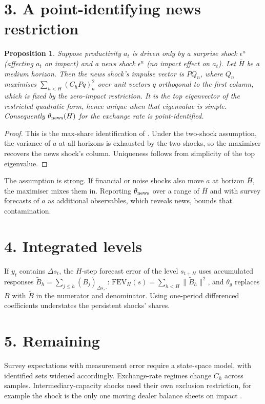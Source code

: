 \documentclass[11pt]{article}
\newtheorem{proposition}[theorem]{Proposition}
\theoremstyle{definition}
\begin{document}
\section*{3. A point-identifying news restriction}
\begin{proposition}\label{prop:maxshare}
Suppose productivity $a_t$ is driven only by a surprise shock $\epsilon^a$ (affecting $a_t$ on impact) and a news shock
$\epsilon^n$ (no impact effect on $a_t$). Let $\bar H$ be a medium horizon. Then the news shock's impulse vector is
$PQ_n$, where $Q_n$ maximises $\sum_{h<\bar H}(C_hPq)_a^2$ over unit vectors $q$ orthogonal to the first column, which
is fixed by the zero-impact restriction. It is the top eigenvector of the restricted quadratic form, hence unique when that
eigenvalue is simple. Consequently $\theta_{\rm news}(H)$ for the exchange rate is point-identified.
\end{proposition}
\begin{proof}
This is the max-share identification of \cite{bs}. Under the two-shock assumption, the variance of $a$ at all horizons is
exhausted by the two shocks, so the maximiser recovers the news shock's column. Uniqueness follows from simplicity of the
top eigenvalue.
\end{proof}
The assumption is strong. If financial or noise shocks also move $a$ at horizon $\bar H$, the maximiser mixes them in.
Reporting $\theta_{\rm news}$ over a range of $\bar H$ and with survey forecasts of $a$ as additional observables, which
reveals news, bounds that contamination.

\section*{4. Integrated levels}
If $y_t$ contains $\Delta s_t$, the $H$-step forecast error of the level $s_{t+H}$ uses accumulated responses
$\tilde B_h=\sum_{j\le h}(B_j)_{\Delta s,\cdot}$:
$\mathrm{FEV}_H(s)=\sum_{h<H}\|\tilde B_h\|^2$, and $\theta_g$ replaces $B$ with $\tilde B$ in the numerator and
denominator. Using one-period differenced coefficients understates the persistent shocks' shares.

\section*{5. Remaining}
Survey expectations with measurement error require a state-space model, with identified sets widened accordingly.
Exchange-rate regimes change $C_h$ across samples. Intermediary-capacity shocks need their own exclusion restriction, for
example the shock is the only one moving dealer balance sheets on impact \cite{or,crs}.
\end{document}
